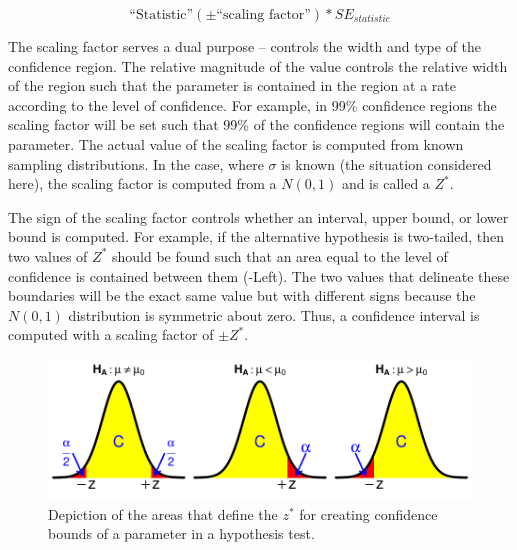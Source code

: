 \documentclass[10pt,openany]{book}\usepackage[]{graphicx}\usepackage[]{color}
\newenvironment{knitrout}{}{} %
\begin{document}
  \[ \text{``Statistic''} (\pm \text{``scaling factor''}) * SE_{statistic} \]

The scaling factor serves a dual purpose -- controls the width and type of the confidence region.  The relative magnitude of the value controls the relative width of the region such that the parameter is contained in the region at a rate according to the level of confidence.  For example, in 99\% confidence regions the scaling factor will be set such that 99\% of the confidence regions will contain the parameter.  The actual value of the scaling factor is computed from known sampling distributions.  In the case, where $\sigma$ is known (the situation considered here), the scaling factor is computed from a $N(0,1)$ and is called a $Z^{*}$.

The sign of the scaling factor controls whether an interval, upper bound, or lower bound is computed.  For example, if the alternative hypothesis is two-tailed, then two values of $Z^{*}$ should be found such that an area equal to the level of confidence is contained between them (-Left).  The two values that delineate these boundaries will be the exact same value but with different signs because the $N(0,1)$ distribution is symmetric about zero.  Thus, a confidence interval is computed with a scaling factor of $\pm Z^{*}$.

\begin{knitrout}
\color{fgcolor}\begin{figure}[hbtp]

{\centering \includegraphics[width=.8\linewidth]{Figs/CIboundsZ-1} 

}

\caption[Depiction of the areas that define the $z^{*}$ for creating confidence bounds of a parameter in a hypothesis test]{Depiction of the areas that define the $z^{*}$ for creating confidence bounds of a parameter in a hypothesis test.}\label{fig:CIboundsZ}
\end{figure}


\end{knitrout}
\end{document}
